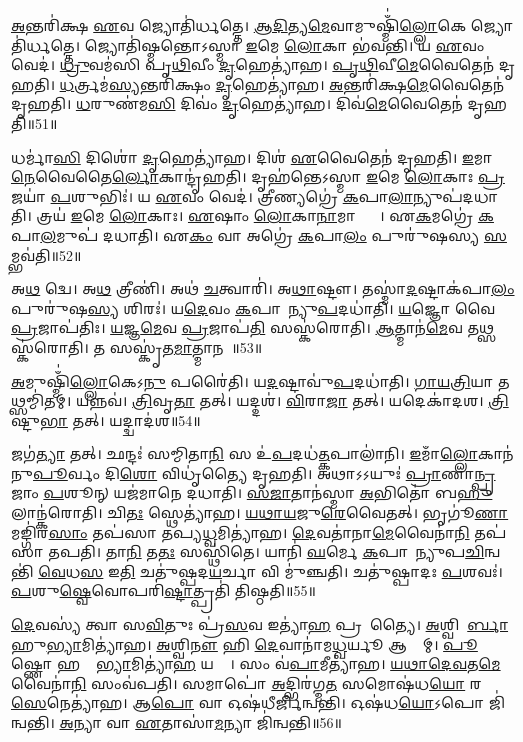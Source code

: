 \ul{𑌅}𑌨𑍍𑌤𑌰𑌿॑𑌕𑍍𑌷 \ul{𑌏}𑌵 𑌜𑍍𑌯𑍋𑌤𑌿॑𑌰𑍍𑌧𑌤𑍍𑌤𑍇।
\ul{𑌆}\ul{𑌦𑌿}𑌤𑍍𑌯\ul{𑌮𑍇}𑌵𑌾𑌮𑍁𑌷𑍍𑌮𑌿𑌁॑\ul{𑌲𑍍𑌲𑍋}𑌕𑍇 𑌜𑍍𑌯𑍋𑌤𑌿॑𑌰𑍍𑌧𑌤𑍍𑌤𑍇।
𑌜𑍍𑌯𑍋𑌤𑌿॑𑌷𑍍𑌮𑌨𑍍𑌤𑍋\-𑌽𑌸𑍍𑌮𑌾 \ul{𑌇}𑌮𑍇 \ul{𑌲𑍋}𑌕𑌾 𑌭॑𑌵𑌨𑍍𑌤𑌿।
𑌯 \ul{𑌏}𑌵𑌂 𑌵𑍇𑌦॑।
\ul{𑌧𑍍𑌰𑍁}𑌵𑌮॑𑌸𑌿 𑌪𑍃\ul{𑌥𑌿}𑌵𑍀𑌂 \ul{𑌦𑍃}\ul{}𑌹𑍇𑌤𑍍𑌯𑌾॑𑌹।
\ul{𑌪𑍃}\ul{𑌥𑌿}𑌵𑍀\ul{𑌮𑍇}𑌵𑍈𑌤𑍇𑌨॑ 𑌦𑍃𑌹𑌤𑌿।
\ul{𑌧}𑌰𑍍𑌤𑍍𑌰𑌮॑\ul{𑌸𑍍𑌯}𑌨𑍍𑌤𑌰𑌿॑𑌕𑍍𑌷𑌂 \ul{𑌦𑍃}\ul{}𑌹𑍇𑌤𑍍𑌯𑌾॑𑌹।
\ul{𑌅}𑌨𑍍𑌤𑌰𑌿॑𑌕𑍍𑌷\ul{𑌮𑍇}𑌵𑍈𑌤𑍇𑌨॑ 𑌦𑍃𑌹𑌤𑌿।
\ul{𑌧}𑌰𑍁𑌣॑𑌮\ul{𑌸𑌿} 𑌦𑌿𑌵𑌂॑ \ul{𑌦𑍃}\ul{}𑌹𑍇𑌤𑍍𑌯𑌾॑𑌹।
𑌦𑌿𑌵॑\ul{𑌮𑍇}𑌵𑍈𑌤𑍇𑌨॑ 𑌦𑍃𑌹𑌤𑌿॥51॥

𑌧𑌰𑍍𑌮𑌾॑\ul{𑌸𑌿} 𑌦𑌿𑌶𑍋॑ \ul{𑌦𑍃}\ul{}𑌹𑍇𑌤𑍍𑌯𑌾॑𑌹।
𑌦𑌿𑌶॑ \ul{𑌏}𑌵𑍈𑌤𑍇𑌨॑ 𑌦𑍃𑌹𑌤𑌿।
\ul{𑌇}𑌮𑌾\ul{𑌨𑍇}𑌵𑍈𑌤𑍈\ul{𑌰𑍍𑌲𑍋}𑌕𑌾𑌨𑍍𑌦𑍃॑𑌹𑌤𑌿।
𑌦𑍃𑌹॑𑌨𑍍𑌤𑍇\-𑌽𑌸𑍍𑌮𑌾 \ul{𑌇}𑌮𑍇 \ul{𑌲𑍋}𑌕𑌾𑌃 \ul{𑌪𑍍𑌰}𑌜𑌯𑌾॑ \ul{𑌪}𑌶𑍁𑌭𑌿𑌃॑।
𑌯 \ul{𑌏}𑌵𑌂 𑌵𑍇𑌦॑।
𑌤𑍍𑌰𑍀𑌣𑍍𑌯𑌗𑍍𑌰𑍇॑ \ul{𑌕}𑌪𑌾\ul{𑌲𑌾}𑌨𑍍𑌯𑍁𑌪॑𑌦𑌧𑌾𑌤𑌿।
𑌤𑍍𑌰𑌯॑ \ul{𑌇}𑌮𑍇 \ul{𑌲𑍋}𑌕𑌾𑌃।
\ul{𑌏}𑌷𑌾𑌂 \ul{𑌲𑍋}𑌕𑌾\ul{𑌨𑌾}𑌮𑌾𑌪𑍍𑌤𑍍𑌯𑍈᳚।
𑌏\ul{𑌕}𑌮𑌗𑍍𑌰𑍇॑ \ul{𑌕}𑌪𑌾\ul{𑌲}𑌮𑍁𑌪॑ 𑌦𑌧𑌾𑌤𑌿।
𑌏\ul{𑌕𑌂} 𑌵𑌾 𑌅𑌗𑍍𑌰𑍇॑ \ul{𑌕}𑌪𑌾\ul{𑌲𑌂} 𑌪𑍁𑌰𑍁॑𑌷𑌸𑍍𑌯 \ul{𑌸}𑌮𑍍𑌭𑌵॑𑌤𑌿॥52॥

𑌅\ul{𑌥} 𑌦𑍍𑌵𑍇।
𑌅\ul{𑌥} 𑌤𑍍𑌰𑍀𑌣𑌿॑।
𑌅𑌥॑ \ul{𑌚}𑌤𑍍𑌵𑌾𑌰𑌿॑।
𑌅\ul{𑌥𑌾}𑌷𑍍𑌟𑍗।
𑌤𑌸𑍍𑌮𑌾॑\ul{𑌦}𑌷𑍍𑌟𑌾𑌕॑𑌪𑌾\ul{𑌲𑌂} 𑌪𑍁𑌰𑍁॑𑌷\ul{𑌸𑍍𑌯} 𑌶𑌿𑌰𑌃॑।
𑌯\ul{𑌦𑍇}𑌵𑌂 \ul{𑌕}𑌪𑌾𑌲𑌾᳚𑌨𑍍𑌯𑍁\ul{𑌪}𑌦𑌧𑌾॑𑌤𑌿।
\ul{𑌯}𑌜𑍍𑌞𑍋 𑌵𑍈 \ul{𑌪𑍍𑌰}𑌜𑌾𑌪॑𑌤𑌿𑌃।
\ul{𑌯}𑌜𑍍𑌞\ul{𑌮𑍇}𑌵 \ul{𑌪𑍍𑌰}𑌜𑌾𑌪॑\ul{𑌤𑌿}\ul{} 𑌸𑌸𑍍𑌕॑𑌰𑍋𑌤𑌿।
\ul{𑌆}𑌤𑍍𑌮𑌾𑌨॑\ul{𑌮𑍇}𑌵 𑌤𑌥𑍍𑌸𑌸𑍍𑌕॑𑌰𑍋𑌤𑌿।
𑌤 𑌸𑌸𑍍𑌕𑍃॑𑌤\ul{𑌮𑌾}𑌤𑍍𑌮𑌾𑌨𑌮𑍍᳚॥53॥

\ul{𑌅}𑌮𑍁𑌷𑍍𑌮𑌿𑌁॑\ul{𑌲𑍍𑌲𑍋}𑌕𑍇𑌽\ul{𑌨𑍁} 𑌪𑌰𑍈॑𑌤𑌿।
𑌯\ul{𑌦}𑌷𑍍𑌟𑌾𑌵𑍁॑\ul{𑌪}𑌦𑌧𑌾॑𑌤𑌿।
\ul{𑌗𑌾}\ul{𑌯}\ul{𑌤𑍍𑌰𑌿}𑌯𑌾 𑌤𑌥𑍍𑌸𑌮𑍍𑌮𑌿॑𑌤𑌮𑍍।
𑌯𑌨𑍍𑌨𑌵॑।
\ul{𑌤𑍍𑌰𑌿}𑌵𑍃\ul{𑌤𑌾} 𑌤𑌤𑍍।
𑌯𑌦𑍍𑌦𑌶॑।
\ul{𑌵𑌿}𑌰𑌾\ul{𑌜𑌾} 𑌤𑌤𑍍।
𑌯𑌦𑍇𑌕𑌾॑𑌦𑌶।
\ul{𑌤𑍍𑌰𑌿}𑌷𑍍𑌟𑍁\ul{𑌭𑌾} 𑌤𑌤𑍍।
𑌯𑌦𑍍𑌦𑍍𑌵𑌾𑌦॑𑌶॥54॥

𑌜𑌗॑\ul{𑌤𑍍𑌯𑌾} 𑌤𑌤𑍍।
𑌛𑌨𑍍𑌦𑌃॑ 𑌸𑌮𑍍𑌮𑌿𑌤𑌾\ul{𑌨𑌿} 𑌸 𑌉॑\ul{𑌪}𑌦𑌧॑\ul{𑌤𑍍𑌕}𑌪𑌾𑌲𑌾॑𑌨𑌿।
\ul{𑌇}𑌮𑌾𑌁\ul{𑌲𑍍𑌲𑍋}𑌕𑌾𑌨॑𑌨𑍁\ul{𑌪𑍂}𑌰𑍍𑌵𑌂 𑌦𑌿\ul{𑌶𑍋} 𑌵𑌿𑌧𑍃॑𑌤𑍍𑌯𑍈 𑌦𑍃𑌹𑌤𑌿।
𑌅𑌥𑌾𑌽𑌽𑌯𑍁𑌃॑ \ul{𑌪𑍍𑌰𑌾}𑌣𑌾\ul{𑌨𑍍𑌪𑍍𑌰}𑌜𑌾𑌂 \ul{𑌪}𑌶𑍂𑌨𑍍 𑌯𑌜॑𑌮𑌾𑌨𑍇 𑌦𑌧𑌾𑌤𑌿।
\ul{𑌸}\ul{𑌜𑌾}𑌤𑌾𑌨॑𑌸𑍍𑌮𑌾 \ul{𑌅}𑌭𑌿𑌤𑍋॑ 𑌬\ul{𑌹𑍁}𑌲𑌾𑌨𑍍𑌕॑𑌰𑍋𑌤𑌿।
𑌚𑌿\ul{𑌤𑌃} 𑌸𑍍𑌥𑍇𑌤𑍍𑌯𑌾॑𑌹।
\ul{𑌯}\ul{𑌥𑌾}\ul{𑌯}𑌜𑍁\ul{𑌰𑍇}𑌵𑍈𑌤𑌤𑍍।
𑌭𑍃𑌗𑍂॑\ul{𑌣𑌾}𑌮𑌙𑍍𑌗𑌿॑𑌰\ul{𑌸𑌾𑌂} 𑌤𑌪॑𑌸𑌾 𑌤𑌪𑍍𑌯\ul{𑌧𑍍𑌵}𑌮𑌿𑌤𑍍𑌯𑌾॑𑌹।
\ul{𑌦𑍇}𑌵𑌤𑌾॑𑌨𑌾\ul{𑌮𑍇}𑌵𑍈𑌨𑌾॑\ul{𑌨𑌿} 𑌤𑌪॑𑌸𑌾 𑌤𑌪𑌤𑌿।
𑌤𑌾\ul{𑌨𑌿} 𑌤\ul{𑌤𑌃} 𑌸𑌸𑍍𑌥𑌿॑𑌤𑍇।
𑌯𑌾𑌨𑌿॑ \ul{𑌘}𑌰𑍍𑌮𑍇 \ul{𑌕}𑌪𑌾𑌲𑌾᳚𑌨𑍍𑌯𑍁𑌪\ul{𑌚𑌿}𑌨𑍍𑌵𑌨𑍍𑌤𑌿॑ \ul{𑌵𑍇}𑌧\ul{𑌸} 𑌇\ul{𑌤𑌿} 𑌚𑌤𑍁॑𑌷𑍍𑌪𑌦\ul{𑌯}𑌰𑍍𑌚𑌾 𑌵𑌿 𑌮𑍁॑𑌞𑍍𑌚𑌤𑌿।
𑌚𑌤𑍁॑𑌷𑍍𑌪𑌾𑌦𑌃 \ul{𑌪}𑌶𑌵𑌃॑।
\ul{𑌪}𑌶𑍁\ul{𑌷𑍍𑌵𑍇}𑌵𑍋𑌪𑌰𑌿॑\ul{𑌷𑍍𑌟𑌾}𑌤𑍍𑌪𑍍𑌰𑌤𑌿॑ 𑌤𑌿𑌷𑍍𑌠𑌤𑌿॥55॥

\ul{𑌦𑍇}𑌵𑌸𑍍𑌯॑ 𑌤𑍍𑌵𑌾 𑌸\ul{𑌵𑌿}𑌤𑍁𑌃 𑌪𑍍𑌰॑\ul{𑌸}𑌵 𑌇𑌤𑍍𑌯𑌾॑\ul{𑌹} 𑌪𑍍𑌰𑌸𑍂᳚𑌤𑍍𑌯𑍈।
\ul{𑌅}𑌶𑍍𑌵𑌿𑌨𑍋᳚\ul{𑌰𑍍𑌬𑌾}𑌹𑍁\ul{𑌭𑍍𑌯𑌾}𑌮𑌿\-𑌤𑍍𑌯𑌾॑𑌹।
\ul{𑌅}𑌶𑍍𑌵𑌿\ul{𑌨𑍗} 𑌹𑌿 \ul{𑌦𑍇}𑌵𑌾𑌨𑌾॑𑌮\ul{𑌧𑍍𑌵}𑌰𑍍𑌯𑍂 𑌆𑌸𑍍𑌤𑌾᳚𑌮𑍍।
\ul{𑌪𑍂}𑌷𑍍𑌣𑍋 𑌹𑌸𑍍𑌤𑌾᳚\ul{𑌭𑍍𑌯𑌾}𑌮𑌿𑌤𑍍𑌯𑌾॑\ul{𑌹} 𑌯𑌤𑍍𑌯𑍈᳚।
𑌸𑌂 𑌵॑\ul{𑌪𑌾}𑌮𑍀𑌤𑍍𑌯𑌾॑𑌹।
\ul{𑌯}\ul{𑌥𑌾}\ul{𑌦𑍇}\ul{𑌵}𑌤\ul{𑌮𑍇}𑌵𑍈𑌨𑌾॑\ul{𑌨𑌿} 𑌸𑌂𑌵॑𑌪𑌤𑌿।
𑌸𑌮𑌾𑌪𑍋॑ \ul{𑌅}𑌦𑍍𑌭𑌿𑌰॑𑌗𑍍𑌮\ul{𑌤} 𑌸𑌮𑍋𑌷॑𑌧\ul{𑌯𑍋} 𑌰\ul{𑌸𑍇}𑌨𑍇𑌤𑍍𑌯𑌾॑𑌹।
𑌆\ul{𑌪𑍋} 𑌵𑌾 𑌓𑌷॑𑌧𑍀𑌰𑍍𑌜𑌿𑌨𑍍𑌵𑌨𑍍𑌤𑌿।
𑌓𑌷॑𑌧\ul{𑌯𑍋}𑌽𑌪𑍋 𑌜𑌿॑𑌨𑍍𑌵𑌨𑍍𑌤𑌿।
\ul{𑌅}𑌨𑍍𑌯𑌾 𑌵𑌾 \ul{𑌏}𑌤𑌾𑌸𑌾॑\ul{𑌮}𑌨𑍍𑌯𑌾 𑌜𑌿॑𑌨𑍍𑌵𑌨𑍍𑌤𑌿॥56॥

